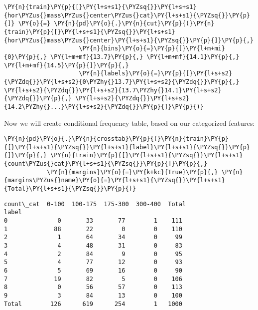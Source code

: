     \begin{tcolorbox}[breakable, size=fbox, boxrule=1pt, pad at break*=1mm,colback=cellbackground, colframe=cellborder]
\begin{Verbatim}[commandchars=\\\{\}]
\PY{n}{train}\PY{p}{[}\PY{l+s+s1}{\PYZsq{}}\PY{l+s+s1}{hor\PYZus{}mass\PYZus{}center\PYZus{}cat}\PY{l+s+s1}{\PYZsq{}}\PY{p}{]} \PY{o}{=} \PY{n}{pd}\PY{o}{.}\PY{n}{cut}\PY{p}{(}\PY{n}{train}\PY{p}{[}\PY{l+s+s1}{\PYZsq{}}\PY{l+s+s1}{hor\PYZus{}mass\PYZus{}center}\PY{l+s+s1}{\PYZsq{}}\PY{p}{]}\PY{p}{,}
                     \PY{n}{bins}\PY{o}{=}\PY{p}{[}\PY{l+m+mi}{0}\PY{p}{,} \PY{l+m+mf}{13.7}\PY{p}{,} \PY{l+m+mf}{14.1}\PY{p}{,} \PY{l+m+mf}{14.5}\PY{p}{]}\PY{p}{,}
                     \PY{n}{labels}\PY{o}{=}\PY{p}{[}\PY{l+s+s2}{\PYZdq{}}\PY{l+s+s2}{0\PYZhy{}13.7}\PY{l+s+s2}{\PYZdq{}}\PY{p}{,} \PY{l+s+s2}{\PYZdq{}}\PY{l+s+s2}{13.7\PYZhy{}14.1}\PY{l+s+s2}{\PYZdq{}}\PY{p}{,} \PY{l+s+s2}{\PYZdq{}}\PY{l+s+s2}{14.2\PYZhy{}...}\PY{l+s+s2}{\PYZdq{}}\PY{p}{]}\PY{p}{)}
\end{Verbatim}
\end{tcolorbox}

    Now we will create conditional frequency table, based on our categorized
features:

    \begin{tcolorbox}[breakable, size=fbox, boxrule=1pt, pad at break*=1mm,colback=cellbackground, colframe=cellborder]
\begin{Verbatim}[commandchars=\\\{\}]
\PY{n}{pd}\PY{o}{.}\PY{n}{crosstab}\PY{p}{(}\PY{n}{train}\PY{p}{[}\PY{l+s+s1}{\PYZsq{}}\PY{l+s+s1}{label}\PY{l+s+s1}{\PYZsq{}}\PY{p}{]}\PY{p}{,} \PY{n}{train}\PY{p}{[}\PY{l+s+s1}{\PYZsq{}}\PY{l+s+s1}{count\PYZus{}cat}\PY{l+s+s1}{\PYZsq{}}\PY{p}{]}\PY{p}{,} 
            \PY{n}{margins}\PY{o}{=}\PY{k+kc}{True}\PY{p}{,} \PY{n}{margins\PYZus{}name}\PY{o}{=}\PY{l+s+s1}{\PYZsq{}}\PY{l+s+s1}{Total}\PY{l+s+s1}{\PYZsq{}}\PY{p}{)}
\end{Verbatim}
\end{tcolorbox}

            \begin{tcolorbox}[breakable, size=fbox, boxrule=.5pt, pad at break*=1mm, opacityfill=0]
\begin{Verbatim}[commandchars=\\\{\}]
count\_cat  0-100  100-175  175-300  300-400  Total
label
0              0       33       77        1    111
1             88       22        0        0    110
2              1       64       34        0     99
3              4       48       31        0     83
4              2       84        9        0     95
5              4       77       12        0     93
6              5       69       16        0     90
7             19       82        5        0    106
8              0       56       57        0    113
9              3       84       13        0    100
Total        126      619      254        1   1000
\end{Verbatim}
\end{tcolorbox}
        
